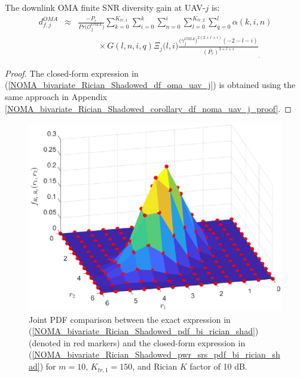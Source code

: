 \begin{proposition} \label{NOMA_bivariate_Rician_Shadowed_proposition_df_oma_uav_j}
The downlink OMA finite SNR diversity gain at UAV-$j$ is:
\begin{eqnarray} 
d_{f,j}^{OMA} & \hspace{0cm} \approx & \hspace{0cm} \frac{-P_r}{Pr\big(\mathcal{O}_{j}^{OMA}\big)} \sum_{k=0}^{K_{tr,1}} \sum_{i=0}^{k} \sum_{n=0}^{i} \sum_{l=0}^{K_{tr,2}} \sum_{q=0}^{l} \alpha(k,i,n) \nonumber \\
 & & \hspace{1cm} \times G(l,n,i,q) \Xi_j\big(l,i\big) \frac{\big(\gamma_j^{OMA}\big)^{2(2+l+i)}(-2-l-i)}{(P_r)^{3+l+i}}_. \label{NOMA_bivariate_Rician_Shadowed_df_oma_uav_j}
\end{eqnarray}
\end{proposition}
\begin{proof}
The closed-form expression in (\ref{NOMA_bivariate_Rician_Shadowed_df_oma_uav_j}) is obtained using the same approach in Appendix \ref{NOMA_bivariate_Rician_Shadowed_corollary_df_noma_uav_j_proof}. 
\end{proof}

\begin{figure} [t] 
\centering
\includegraphics [width=0.6\columnwidth]{chap8_fig/pdf_comparison_edited.eps} 
\caption{Joint PDF comparison between the exact expression in (\ref{NOMA_bivariate_Rician_Shadowed_pdf_bi_rician_shad}) (denoted in red markers) and the closed-form expression in (\ref{NOMA_bivariate_Rician_Shadowed_pwr_srs_pdf_bi_rician_shad}) for $m=10$, $K_{tr,1}=150$, and Rician $K$ factor of 10 dB.}
\label{fig:NOMA_bivariate_Rician_Shadowed_pdf_comp}
\end{figure}

